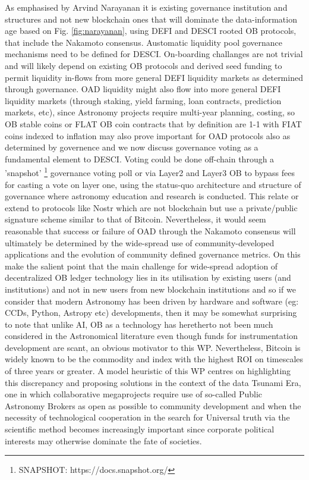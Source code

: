 \documentclass[final,5p,times,twocolumn,authoryear]{elsarticle}
\begin{document}
As emphasised by Arvind Narayanan it is existing governance institution and structures and not new blockchain ones that will dominate the data-information age based on Fig. \ref{fig:narayanan}, using DEFI and DESCI rooted OB protocols, that include the Nakamoto consensus. Austomatic liquidity pool governance mechanisms need to be defined for DESCI. On-boarding challanges are not trivial and will likely depend on existing OB protocols and derived seed funding to permit liquidity in-flows from more general DEFI liquidity markets as determined through governance. OAD liquidity might also flow into more general DEFI liquidity markets (through staking, yield farming, loan contracts, prediction markets, etc), since Astronomy projects require multi-year planning, costing, so OB stable coins or FLAT OB coin contracts that by definition are 1-1 with FIAT coins indexed to inflation may also prove important for OAD protocols also as determined by governence and we now discuss governance voting as a fundamental element to DESCI. Voting could be done off-chain through a 'snapshot' \footnote{SNAPSHOT: https://docs.snapshot.org/} governance voting poll or via Layer2 and Layer3 OB to bypass fees for casting a vote on layer one, using the status-quo architecture and structure of governance where astronomy education and research is conducted. This relate or extend to protocols like Nostr which are not blockchain but use a private/public signature scheme similar to that of Bitcoin. Nevertheless, it would seem reasonable that success or failure of OAD through the Nakamoto consensus will ultimately be determined by the wide-spread use of community-developed applications and the evolution of community defined governance metrics. On this \cite{arvindandclark2017} make the salient point that the main challenge for wide-spread adoption of decentralized OB ledger technology lies in its utilisation by existing users (and institutions) and not in new users from new blockchain institutions and so if we consider that modern Astronomy has been driven by hardware and software (eg: CCDs, Python, Astropy etc) developments, then it may be somewhat surprising to note that unlike AI, OB as a technology has heretherto not been much considered in the Astronomical literature even though funds for instrumentation development are scant, an obvious motivator to this WP. Nevertheless, Bitcoin is widely known to be the commodity and index with the highest ROI on timescales of three years or greater. A model heuristic of this WP centres on highlighting this discrepancy and proposing solutions in the context of the data Tsunami Era, one in which collaborative megaprojects require use of so-called Public Astronomy Brokers as open as possible to community development and when the necessity of technological cooperation in the search for Universal truth via the scientific method becomes increasingly important since corporate political interests may otherwise dominate the fate of societies.  
\end{document}
